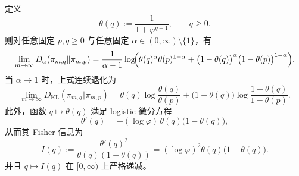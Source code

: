 \begin{theorem}\label{thm:killo-fold-bin-escort-renyi-logistic-geometry}
定义
\[
\theta(q):=\frac{1}{1+\varphi^{q+1}},
\qquad q\ge 0.
\]
则对任意固定 \(p,q\ge 0\) 与任意固定 \(\alpha\in(0,\infty)\setminus\{1\}\)，有
\[
\lim_{m\to\infty}D_\alpha(\pi_{m,q}\Vert \pi_{m,p})
=
\frac{1}{\alpha-1}
\log\!\Bigl(
\theta(q)^\alpha\theta(p)^{1-\alpha}
+
\bigl(1-\theta(q)\bigr)^\alpha\bigl(1-\theta(p)\bigr)^{1-\alpha}
\Bigr).
\]
当 \(\alpha\to 1\) 时，上式连续退化为
\[
\lim_{m\to\infty}D_{\mathrm{KL}}(\pi_{m,q}\Vert \pi_{m,p})
=
\theta(q)\log\frac{\theta(q)}{\theta(p)}
+
\bigl(1-\theta(q)\bigr)\log\frac{1-\theta(q)}{1-\theta(p)}.
\]
此外，函数 \(q\mapsto \theta(q)\) 满足 logistic 微分方程
\[
\theta'(q)=-(\log\varphi)\,\theta(q)\bigl(1-\theta(q)\bigr),
\]
从而其 Fisher 信息为
\[
I(q):=\frac{\theta'(q)^2}{\theta(q)(1-\theta(q))}
=(\log\varphi)^2\theta(q)\bigl(1-\theta(q)\bigr).
\]
并且 \(q\mapsto I(q)\) 在 \([0,\infty)\) 上严格递减。
\end{theorem}

